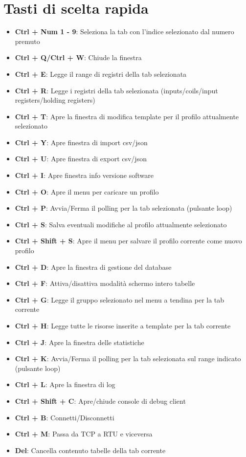 
\chapter{Tasti di scelta rapida}

\begin{itemize}
\item \textbf{Ctrl + Num 1 - 9}: Seleziona la tab con l'indice selezionato dal numero premuto
\item \textbf{Ctrl + Q/Ctrl + W}: Chiude la finestra
\item \textbf{Ctrl + E}: Legge il range di registri della tab selezionata
\item \textbf{Ctrl + R}: Legge i registri della tab selezionata (inputs/coils/input registers/holding registers)
\item \textbf{Ctrl + T}: Apre la finestra di modifica template per il profilo attualmente selezionato
\item \textbf{Ctrl + Y}: Apre finestra di import csv/json
\item \textbf{Ctrl + U}: Apre finestra di export csv/json
\item \textbf{Ctrl + I}: Apre finestra info versione software
\item \textbf{Ctrl + O}: Apre il menu per caricare un profilo
\item \textbf{Ctrl + P}: Avvia/Ferma il polling per la tab selezionata (pulsante loop)
\item \textbf{Ctrl + S}: Salva eventuali modifiche al profilo attualmente selezionato
\item \textbf{Ctrl + Shift + S}: Apre il menu per salvare il profilo corrente come nuovo profilo
\item \textbf{Ctrl + D}: Apre la finestra di gestione del database
\item \textbf{Ctrl + F}: Attiva/disattiva modalità schermo intero tabelle
\item \textbf{Ctrl + G}: Legge il gruppo selezionato nel menu a tendina per la tab corrente
\item \textbf{Ctrl + H}: Legge tutte le risorse inserite a template per la tab corrente
\item \textbf{Ctrl + J}: Apre la finestra delle statistiche
\item \textbf{Ctrl + K}: Avvia/Ferma il polling per la tab selezionata sul range indicato (pulsante loop)
\item \textbf{Ctrl + L}: Apre la finestra di log
\item \textbf{Ctrl + Shift + C}: Apre/chiude console di debug client
\item \textbf{Ctrl + B}: Connetti/Disconnetti
\item \textbf{Ctrl + M}: Passa da TCP a RTU e viceversa
\item \textbf{Del}: Cancella contenuto tabelle della tab corrente
\end{itemize}